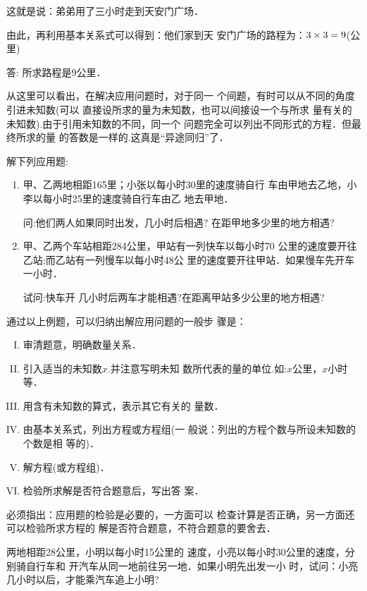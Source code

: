 这就是说：弟弟用了三小时走到天安门广场．

由此，再利用基本关系式可以得到：他们家到天
安门广场的路程为：$3\times3= 9$(公里)
    
答: 所求路程是9公里．

从这里可以看出，在解决应用问题时，对于同一
个间题，有时可以从不同的角度引进未知数(可以
直接设所求的量为未知数，也可以间接设一个与所求
量有关的未知数).由于引用未知数的不同，同一个
问题完全可以列出不同形式的方程．但最终所求的量
的答数是一样的.这真是“异途同归”了．


\begin{ex}
    解下列应用题:
\begin{enumerate}
    \item 甲、乙两地相距165里；小张以每小时30里的速度骑自行
    车由甲地去乙地，小李以每小时25里的速度骑自行车由乙
    地去甲地．
    
    问:他们两人如果同时出发，几小时后相遇?
    在距甲地多少里的地方相遇?
    \item 甲、乙两个车站相距284公里，甲站有一列快车以每小时70
    公里的速度要开往乙站;而乙站有一列慢车以每小时48公
    里的速度要开往甲站．如果慢车先开车一小时．
    
    试问:快车开
    几小时后两车才能相遇?在距离甲站多少公里的地方相遇?
\end{enumerate}
\end{ex}    
    
通过以上例题，可以归纳出解应用问题的一般步
骤是：

\begin{blk}{}
\begin{enumerate}[I. ]
    \item 审清题意，明确数量关系．
    \item 引入适当的未知数$x$.并注意写明未知
    数所代表的量的单位.如:$x$公里，$x$小时等．
    \item 用含有未知数的算式，表示其它有关的
    量数．
    \item 由基本关系式，列出方程或方程组(一
    般说：列出的方程个数与所设未知数的个数是相
    等的)．
    \item 解方程(或方程组)．
    \item 检验所求解是否符合题意后，写出答
    案．
\end{enumerate}
\end{blk}

必须指出：应用题的检验是必要的，一方面可以
检查计算是否正确，另一方面还可以检验所求方程的
解是否符合题意，不符合题意的要舍去．

\begin{example}
    两地相距28公里，小明以每小时15公里的
速度，小亮以每小时30公里的速度，分别骑自行车和
开汽车从同一地前往另一地．如果小明先出发一小
时，试问：小亮几小时以后，才能乘汽车追上小明?
\end{example}

